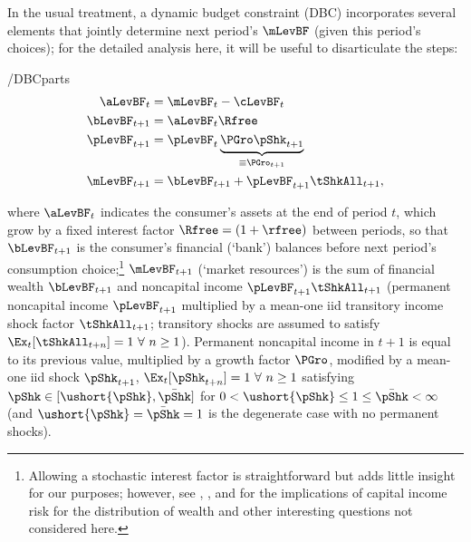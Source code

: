 \documentclass[BufferStockTheory]{subfiles}
\begin{document}
In the usual treatment, a dynamic budget constraint (DBC) incorporates
several elements that jointly determine next period's $\mLevBF$ (given this
period's choices); for the detailed analysis here, it will be useful to
disarticulate the steps:\hypertarget{DBCParts}{}
\begin{verbatimwrite}{\EqDir/DBCparts}
  \begin{align}
    \aLevBF_{t}    & = \mLevBF_{t}-\cLevBF_{t}  \label{eq:DBCparts} \\
    \bLevBF_{t+1}    & = \aLevBF_{t} \Rfree \notag \\
    \pLevBF_{t+1}  & = \pLevBF_{t} \underbrace{\PGro\pShk_{t+1}}_{\equiv \PGro_{t+1}}  \notag \\
    \mLevBF_{t+1}  & =  \bLevBF_{t+1} +\pLevBF_{t+1}\tShkAll_{t+1},  \notag
  \end{align}
\end{verbatimwrite}
 where $\aLevBF_{t}$ indicates the consumer's assets at the end of period $t$, which grow by a fixed interest factor $\Rfree =(1+\rfree)$ between periods,  so that $\bLevBF_{t+1}$ is the consumer's financial (`bank') balances before next period's consumption choice;\footnote{Allowing a stochastic interest factor is straightforward but adds little insight for our purposes; however, see \cite{benhabibWealth}, \cite{maTodaRich}, and \cite{mstIncFluct} for the implications of capital income risk for the distribution of wealth and other interesting questions not considered here.} $\mLevBF_{t+1}$ (`market resources') is the sum of financial wealth $\bLevBF_{t+1}$ and noncapital income $\pLevBF_{t+1}\tShkAll_{t+1}$ (permanent noncapital income $\pLevBF_{t+1}$ multiplied by a mean-one iid transitory income shock factor $\tShkAll_{t+1}$; transitory shocks are assumed to satisfy $\Ex_{t}[{\tShkAll}_{t+n}]=1~\forall~n\geq 1$). Permanent noncapital income in $t+1$ is equal to its previous value, multiplied by a growth factor $\PGro$, modified by a mean-one iid shock $\pShk_{t+1}$, $\Ex_{t}[{\pShk}_{t+n}]=1~\forall~n \geq 1$ satisfying $\pShk \in [\ushort{\pShk},\bar{\pShk}]$ for $0 < \ushort{\pShk} \leq 1 \leq \bar{\pShk} < \infty$ (and $\ushort{\pShk}=\bar{\pShk}=1$ is the degenerate case with no permanent shocks).
\end{document}
